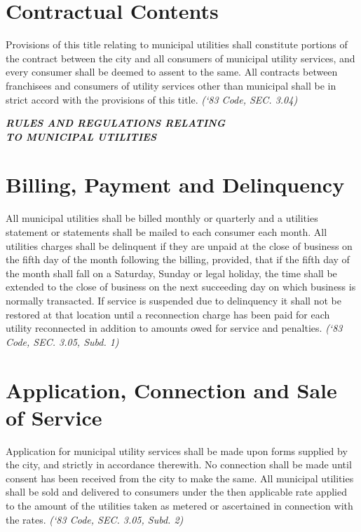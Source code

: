 \documentclass[code.tex]{subfiles}
\begin{document}
\section{Contractual Contents}
Provisions of this title relating to municipal utilities shall constitute portions of the contract between the city and all consumers of municipal utility services, and every consumer shall be deemed to assent to the same.  All contracts between franchisees and consumers of utility services other than municipal shall be in strict accord with the provisions of this title.\newline
\emph{(‘83 Code, SEC. 3.04)}\newline

\begin{center}
\textbf{\emph{\LARGE{RULES AND REGULATIONS RELATING\\TO MUNICIPAL UTILITIES}}}
\end{center}
\setcounter{section}{14}
\section{Billing, Payment and Delinquency}
All municipal utilities shall be billed monthly or quarterly and a utilities statement or statements shall be mailed to each consumer each month.  All utilities charges shall be delinquent if they are unpaid at the close of business on the fifth day of the month following the billing, provided, that if the fifth day of the month shall fall on a Saturday, Sunday or legal holiday, the time shall be extended to the close of business on the next succeeding day on which business is normally transacted.  If service is suspended due to delinquency it shall not be restored at that location until a reconnection charge has been paid for each utility reconnected in addition to amounts owed for service and penalties.\newline
\emph{(‘83 Code, SEC. 3.05, Subd. 1)}
\section{Application, Connection and Sale of Service}
Application for municipal utility services shall be made upon forms supplied by the city, and strictly in accordance therewith.  No connection shall be made until consent has been received from the city to make the same.  All municipal utilities shall be sold and delivered to consumers under the then applicable rate applied to the amount of the utilities taken as metered or ascertained in connection with the rates.\newline
\emph{(‘83 Code, SEC. 3.05, Subd. 2)}
\end{document}
